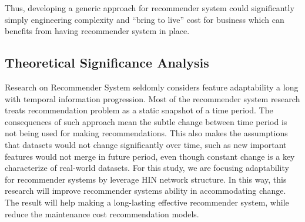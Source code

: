 \documentclass[12pt,a4 paper,title page]{article}
\begin{document}
Thus, developing a generic approach for recommender system could significantly simply engineering complexity and “bring to live” cost for business which can benefits from having recommender system in place. 

\subsection{Theoretical Significance Analysis}
Research on Recommender System seldomly considers feature adaptability a long with temporal information progression. Most of the recommender system research treats recommendation problem as a static snapshot of a time period. The consequences of such approach mean the subtle change between time period is not being used for making recommendations. This also makes the assumptions that datasets would not change significantly over time, such as new important features would not merge in future period, even though constant change is a key characterize of real-world datasets. For this study, we are focusing adaptability for recommender systems by leverage HIN network structure.  In this way, this research will improve recommender systems ability in accommodating change. The result will help making a long-lasting effective recommender system, while reduce the maintenance cost recommendation models. 

\clearpage


\end{document}
